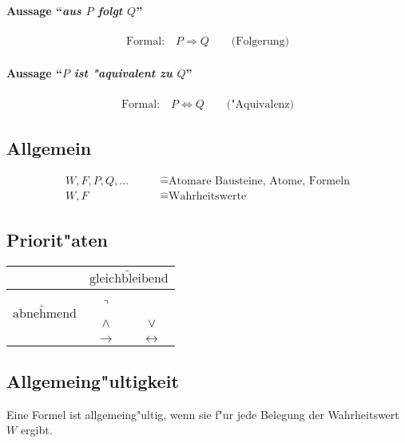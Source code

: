\paragraph{Aussage ``\textit{aus $P$ folgt $Q$}''}
\begin{gather*}
	\text{Formal:} \quad P\Longrightarrow Q\qquad\text{(Folgerung)}
\end{gather*}

\paragraph{Aussage ``\textit{$P$ ist "aquivalent zu $Q$}''}
\begin{gather*}
	\text{Formal:} \quad P\Longleftrightarrow Q\qquad\text{("Aquivalenz)}
\end{gather*}

\subsection{Allgemein}
\begin{align*}
	W,F,P,Q,\ldots\qquad &\hat{=}\text{Atomare Bausteine, Atome, Formeln} \\
	W,F\qquad &\hat{=}\text{Wahrheitswerte}
\end{align*}

\subsection{Priorit"aten}
\begin{center}
	\begin{tabular}{c|cc}
		& \multicolumn{2}{c}{$\underrightarrow{\text{gleichbleibend}}$} \\
		\hline
		\multirow{3}{5mm}{\begin{sideways}$\underleftarrow{\text{abnehmend}}$\end{sideways}} & & \\
			& $\urcorner$ & \\
			& $\wedge$ & $\vee$ \\
			& $\rightarrow$ & $\leftrightarrow$ \\
	\end{tabular}
\end{center}
\vspace{2mm}

\subsection{Allgemeing"ultigkeit}
Eine Formel ist allgemeing"ultig, wenn sie f"ur jede Belegung der Wahrheitswert $W$
ergibt.

